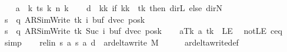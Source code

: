 \begin{isabellebody}
\ \ \isamarkupfalse%
\ {\isacharquery}{\kern0pt}a\ {\isacharequal}{\kern0pt}\ {\isachardoublequoteopen}{\isasymlambda}k{\isachardot}{\kern0pt}\ ts\ k\ {\isacharparenleft}{\kern0pt}n\ k{\isacharparenright}{\kern0pt}{\isachardoublequoteclose}\isanewline
\ \ \isamarkupfalse%
\ {\isacharquery}{\kern0pt}d\ {\isacharequal}{\kern0pt}\ {\isachardoublequoteopen}{\isasymlambda}kk{\isachardot}{\kern0pt}\ if\ kk\ {\isacharequal}{\kern0pt}\ tk\ then\ dir{\isachardot}{\kern0pt}L\ else\ dir{\isachardot}{\kern0pt}N{\isachardoublequoteclose}\isanewline
\ \ \isamarkupfalse%
\ {\isacharquery}{\kern0pt}s\ {\isacharequal}{\kern0pt}\ {\isachardoublequoteopen}{\isacharparenleft}{\kern0pt}q{\isacharcomma}{\kern0pt}\ AR{\isacharunderscore}{\kern0pt}SimWrite{\isacharcomma}{\kern0pt}\ tk{\isacharcomma}{\kern0pt}\ i{\isacharcomma}{\kern0pt}\ buf{\isacharcomma}{\kern0pt}\ dvec{\isacharcomma}{\kern0pt}\ posk{\isacharparenright}{\kern0pt}{\isachardoublequoteclose}\isanewline
\ \ \isamarkupfalse%
\ {\isacharquery}{\kern0pt}s{\isacharprime}{\kern0pt}\ {\isacharequal}{\kern0pt}\ {\isachardoublequoteopen}{\isacharparenleft}{\kern0pt}q{\isacharcomma}{\kern0pt}\ AR{\isacharunderscore}{\kern0pt}SimWrite{\isacharcomma}{\kern0pt}\ tk{\isacharcomma}{\kern0pt}\ Suc\ i{\isacharcomma}{\kern0pt}\ buf{\isacharcomma}{\kern0pt}\ dvec{\isacharcomma}{\kern0pt}\ posk{\isacharparenright}{\kern0pt}{\isachardoublequoteclose}\isanewline
\ \ \isamarkupfalse%
\ aTk{\isacharcolon}{\kern0pt}\ {\isachardoublequoteopen}{\isacharquery}{\kern0pt}a\ tk\ {\isasymnoteq}\ LE{}{\isachardoublequoteclose}\ \isamarkupfalse%
\ notLE\ c{\isacharprime}{\kern0pt}{\isacharunderscore}{\kern0pt}eq\ \isamarkupfalse%
\ simp\isanewline
\ \ \isamarkupfalse%
\ rel{\isacharunderscore}{\kern0pt}in{\isacharcolon}{\kern0pt}\ {\isachardoublequoteopen}{\isacharparenleft}{\kern0pt}{\isacharquery}{\kern0pt}s{\isacharcomma}{\kern0pt}\ {\isacharquery}{\kern0pt}a{\isacharcomma}{\kern0pt}\ {\isacharquery}{\kern0pt}s{\isacharprime}{\kern0pt}{\isacharcomma}{\kern0pt}\ {\isacharquery}{\kern0pt}a{\isacharcomma}{\kern0pt}\ {\isacharquery}{\kern0pt}d{\isacharparenright}{\kern0pt}\ {\isasymin}\ ar{\isacharunderscore}{\kern0pt}delta{\isacharunderscore}{\kern0pt}write\ M{\isachardoublequoteclose}\isanewline
\ \ \ \ \isamarkupfalse%
\ ar{\isacharunderscore}{\kern0pt}delta{\isacharunderscore}{\kern0pt}write{\isacharunderscore}{\kern0pt}def\isanewline
\ \ \ \ \isamarkupfalse%

\end{isabellebody}
